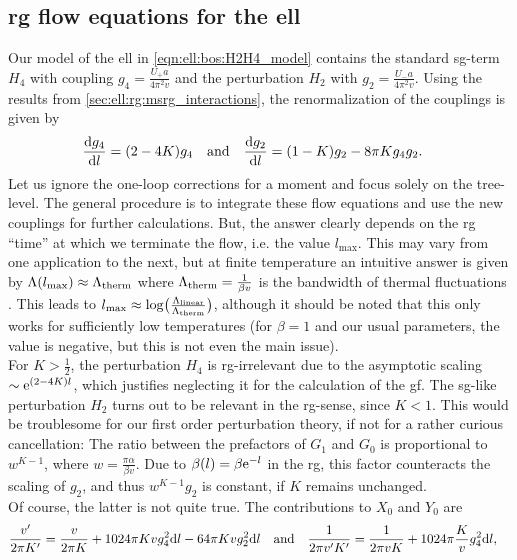 \subsection{\texorpdfstring{\acrshort{rg}}{RG} flow equations for the \texorpdfstring{\acrshort{ell}}{eLL}}\label{sec:ell:rg:flow_eqn_ell}
Our model of the \gls{ell} in \autoref{eqn:ell:bos:H2H4_model} contains the standard \gls{sg}-term $H_4$ with coupling $g_4 = \frac{U_+a}{4\pi^2v}$ and the perturbation $H_2$ with $g_2 = \frac{U_-a}{4\pi^2v}$.
Using the results from \autoref{sec:ell:rg:msrg_interactions}, the renormalization of the couplings is given by
\begin{align*}
\frac{\d g_4}{\d l} &= \kla*{2 - 4K} g_4 \quad \text{and} \quad \frac{\d g_2}{\d l} = \kla*{1 - K} g_2 - 8\pi K g_4 g_2.
\end{align*}
Let us ignore the one-loop corrections for a moment and focus solely on the tree-level.
The general procedure is to integrate these flow equations and use the new couplings for further calculations.
But, the answer clearly depends on the \gls{rg} ``time'' at which we terminate the flow, i.e. the value $l_\text{max}$.
This may vary from one application to the next, but at finite temperature an intuitive answer is given by $\Lambda(l_\text{max}) \approx \Lambda_\ttherm$ where $\Lambda_\ttherm=\frac{1}{\beta v}$ is the bandwidth of thermal fluctuations \cite[]{AltlandSimons}.
This leads to $l_\text{max} \approx \log\kla[\big]{\frac{\Lambda_\tlin}{\Lambda_\ttherm}}$, although it should be noted that this only works for sufficiently low temperatures (for $\beta=1$ and our usual parameters, the value is negative, but this is not even the main issue).\\
For $K> \frac{1}{2}$, the perturbation $H_4$ is \gls{rg}-irrelevant due to the asymptotic scaling $\sim \powe{(2-4K)l}$, which justifies neglecting it for the calculation of the \gls{gf}.
The \gls{sg}-like perturbation $H_2$ turns out to be relevant in the \gls{rg}-sense, since $K<1$.
This would be troublesome for our first order perturbation theory, if not for a rather curious cancellation: The ratio between the prefactors of $G_1$ and $G_0$ is proportional to $w^{K-1}$, where $w=\frac{\pi\alpha}{\beta v}$.
Due to $\beta(l)=\beta\powe{-l}$ in the \tms{} \gls{rg}, this factor counteracts the scaling of $g_2$, and thus $w^{K-1} g_2$ is constant, if $K$ remains unchanged.\\
Of course, the latter is not quite true.
The contributions to $X_0$ and $Y_0$ are
\begin{align*}
\frac{v'}{2\pi K'} &= \frac{v}{2\pi K} + 1024\pi Kv g_4^2 \d l - 64\pi Kv g_2^2 \d l \quad \text{and} \quad
\frac{1}{2\pi v' K'} = \frac{1}{2\pi vK} + 1024\pi \frac{K}{v} g_4^2 \d l,
\end{align*}
